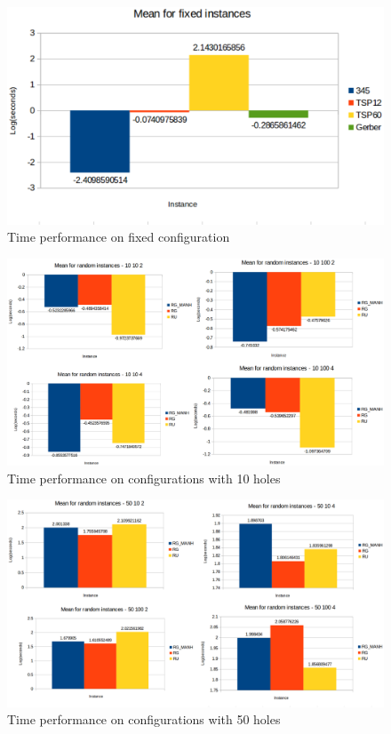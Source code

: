 \begin{figure}[H]
  \centering
  \includegraphics[width=.8\columnwidth]{pics/partI/mean-fixed.eps}
  \caption{Time performance on fixed configuration}
  \label{fig:mean-time-fixed}
\end{figure}

\begin{figure}[H]
  \centering
  \includegraphics[width=.8\columnwidth]{pics/partI/mean-10.eps}
  \caption{Time performance on configurations with 10 holes}
  \label{fig:mean-time-10}
\end{figure}

\begin{figure}[H]
  \centering
  \includegraphics[width=.8\columnwidth]{pics/partI/mean-50.eps}
  \caption{Time performance on configurations with 50 holes}
  \label{fig:mean-time-50}
\end{figure}

